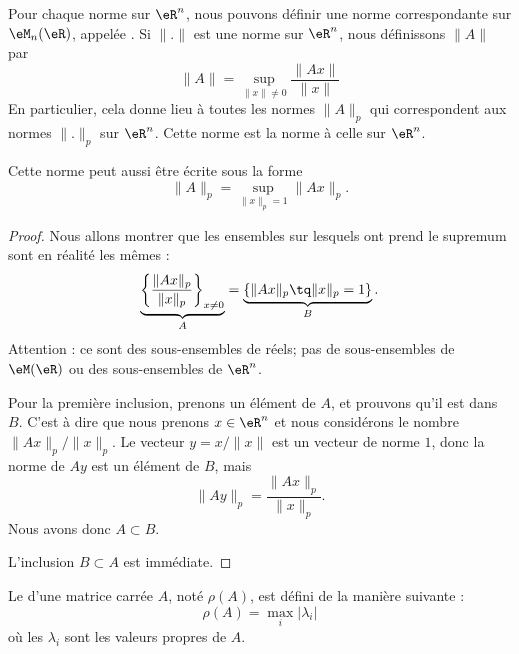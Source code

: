 \begin{example}     \label{ExemdefnormpMrt}
    Pour chaque norme sur \( \eR^n\), nous pouvons définir une norme correspondante sur \( \eM_n(\eR)\), appelée . Si \( \| . \|\) est une norme sur \( \eR^n\), nous définissons \( \| A \|\) par
    \begin{equation}
        \|A\|=\sup_{\|x\|\neq 0}\frac{\|Ax\|}{\|x\|}
    \end{equation}
    En particulier, cela donne lieu à toutes les normes \( \| A \|_p\) qui correspondent aux normes \( \| . \|_p\) sur \( \eR^n\). Cette norme est la norme  à celle sur \( \eR^n\).
\end{example}

\begin{lemma}
    Cette norme peut aussi être écrite sous la forme
    \begin{equation}
        \| A \|_p=\sup_{\|x\|_p=1}\|Ax\|_p.
    \end{equation}
\end{lemma}

\begin{proof}
    Nous allons montrer que les ensembles sur lesquels ont prend le supremum sont en réalité les mêmes :
    \begin{equation}
        \underbrace{\left\{ \frac{ \| Ax \|_p }{ \| x \|_p }\right\}_{x\neq 0}}_{A}=\underbrace{\left\{ \| Ax \|_p\tq \| x \|_p=1 \right\}}_{B}.
    \end{equation}
    Attention : ce sont des sous-ensembles de réels; pas de sous-ensembles de \( \eM(\eR)\) ou des sous-ensembles de \( \eR^n\).

    Pour la première inclusion, prenons un élément de \( A\), et prouvons qu'il est dans \( B\). C'est à dire que nous prenons \( x\in\eR^n\) et nous considérons le nombre \( \| Ax \|_p/\| x \|_p\). Le vecteur \( y=x/\| x \|\) est un vecteur de norme $1$, donc la norme de \( Ay\) est un élément de \( B\), mais
    \begin{equation}
        \| Ay \|_p=\frac{ \| Ax \|_p }{ \| x \|_p }.
    \end{equation}
    Nous avons donc \( A\subset B\).

    L'inclusion \( B\subset A\) est immédiate.
\end{proof}

\begin{definition}
    Le  d'une matrice carrée $A$, noté $\rho(A)$, est défini de la manière suivante :
    \begin{equation}
        \rho(A)=\max_i|\lambda_i|
    \end{equation}
    où les $\lambda_i$ sont les valeurs propres de $A$.
\end{definition}

